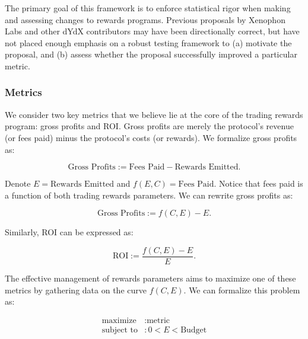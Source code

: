         The primary goal of this framework is to enforce statistical rigor when making and assessing changes to rewards programs. Previous proposals by Xenophon Labs and other dYdX contributors may have been directionally correct, but have not placed enough emphasis on a robust testing framework to (a) motivate the proposal, and (b) assess whether the proposal successfully improved a particular metric.

        \subsubsection{Metrics}

            We consider two key metrics that we believe lie at the core of the trading rewards program: gross profits and ROI. Gross profits are merely the protocol's revenue (or fees paid) minus the protocol's costs (or rewards). We formalize gross profits as:

            \begin{equation}
                \text{Gross Profits} := \text{Fees Paid} - \text{Rewards Emitted}.
            \end{equation}

            Denote $E = \text{Rewards Emitted}$ and $f(E, C) = \text{Fees Paid}$. Notice that fees paid is a function of both trading rewards parameters. We can rewrite gross profits as:

            \begin{equation}
                \text{Gross Profits} := f(C, E) - E.
            \end{equation}
            
            Similarly, ROI can be expressed as:

            \begin{equation}
                \text{ROI} := \frac{f(C, E) - E}{E}.
            \end{equation}

            The effective management of rewards parameters aims to maximize one of these metrics by gathering data on the curve $f(C, E)$. We can formalize this problem as: 

            \begin{align*}
                \text{maximize} &: \text{metric} \\ 
                \text{subject to} &: 0 < E < \text{Budget} 
            \end{align*}

